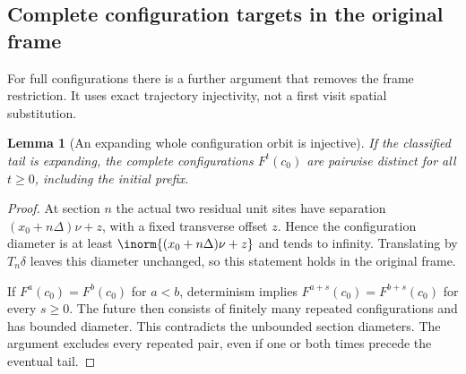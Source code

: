 \documentclass[11pt,letterpaper]{article}
\numberwithin{equation}{section}
\newtheorem{lemma}[theorem]{Lemma}
\theoremstyle{definition}
\theoremstyle{remark}
\begin{document}
\subsection{Complete configuration targets in the original frame}
For full configurations there is a further argument that removes the frame restriction. It uses exact trajectory injectivity, not a first visit spatial substitution.

\begin{lemma}[An expanding whole configuration orbit is injective]\label{smc:og:lem:orbit-injective}
If the classified tail is expanding, the complete configurations $F^t(c_0)$ are pairwise distinct for all $t\ge0$, including the initial prefix.
\end{lemma}
\begin{proof}
At section $n$ the actual two residual unit sites have separation $(x_0+n\Delta)\nu+z$, with a fixed transverse offset $z$. Hence the configuration diameter is at least $\inorm{(x_0+n\Delta)\nu+z}$ and tends to infinity. Translating by $T_n\delta$ leaves this diameter unchanged, so this statement holds in the original frame.

If $F^a(c_0)=F^b(c_0)$ for $a<b$, determinism implies $F^{a+s}(c_0)=F^{b+s}(c_0)$ for every $s\ge0$. The future then consists of finitely many repeated configurations and has bounded diameter. This contradicts the unbounded section diameters. The argument excludes every repeated pair, even if one or both times precede the eventual tail.
\end{proof}
\end{document}
